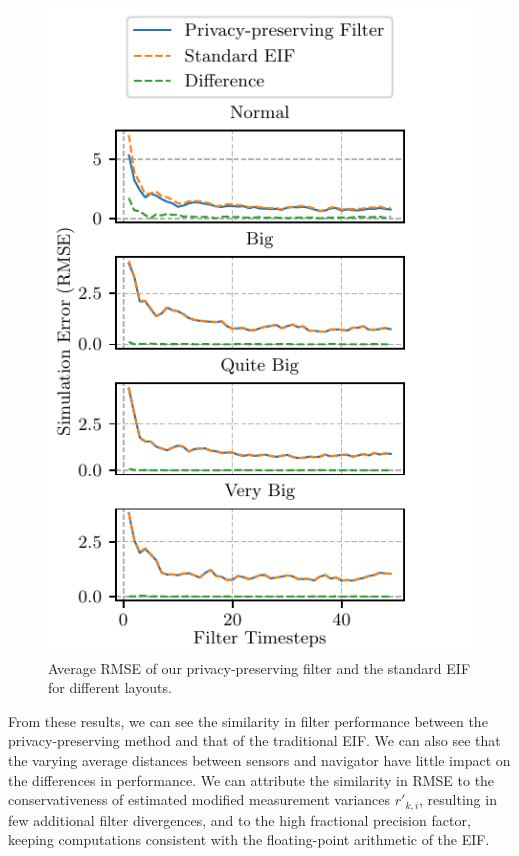 \documentclass[10pt,letterpaper,oneside,twocolumn,journal]{IEEEtran}
\theoremstyle{definition}
\theoremstyle{definition}
\theoremstyle{remark}
\begin{document}
\begin{figure}[htbp]
    \centering
    \includegraphics{images/layout_errors.pdf}
    \caption{Average RMSE of our privacy-preserving filter and the standard EIF for different layouts.}
    \vspace{-\baselineskip}
    \label{fig:sim_layout_errors}
\end{figure}
From these results, we can see the similarity in filter performance between the privacy-preserving method and that of the traditional EIF. We can also see that the varying average distances between sensors and navigator have little impact on the differences in performance. We can attribute the similarity in RMSE to the conservativeness of estimated modified measurement variances $r'_{k,i}$, resulting in few additional filter divergences, and to the high fractional precision factor, keeping computations consistent with the floating-point arithmetic of the EIF.
\end{document}

